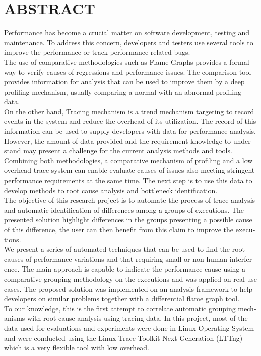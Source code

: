 %

\chapter*{ABSTRACT}\thispagestyle{headings}
%
\begin{otherlanguage}{english}

Performance has become a crucial matter on software development, testing and maintenance. To address this concern, developers and testers use several tools to improve the performance or track performance related bugs. \\
The use of comparative methodologies such as Flame Graphs provides a formal way to verify causes of regressions and performance issues. The comparison tool provides information for analysis that can be used to improve them by a deep profiling mechanism, usually comparing a normal with an abnormal profiling data.\\
On the other hand, Tracing mechanism is a trend mechanism targeting to record events in the system and reduce the overhead of its utilization. The record of this information can be used to supply developers with data for performance analysis. However, the amount of data provided and the requirement knowledge to understand may present a challenge for the current analysis methods and tools.\\
Combining both methodologies, a comparative mechanism of profiling and a low overhead trace system can enable evaluate causes of issues also meeting stringent performance requirements at the same time. The next step is to use this data to develop methods to root cause analysis and bottleneck identification.\\
The objective of this research project is to automate the process of trace analysis and automatic identification of differences among a groups of executions. The presented solution highlight differences in the groups presenting a possible cause of this difference, the user can then benefit from this claim to improve the executions. \\
We present a series of automated techniques that can be used to find the root causes of performance variations and that requiring small or non human interference. The main approach is capable to indicate the performance cause using a comparative grouping methodology on the executions and was applied on real use cases. The proposed solution was implemented on an analysis framework to help developers on similar problems together with a differential flame graph tool. \\
To our knowledge, this is the first attempt to correlate automatic grouping mechanisms with root cause analysis using tracing data. In this project, most of the data used for evaluations and experiments were done in Linux Operating System and were conducted using the Linux Trace Toolkit Next Generation (LTTng) which is a very flexible tool with low overhead.


\end{otherlanguage}
